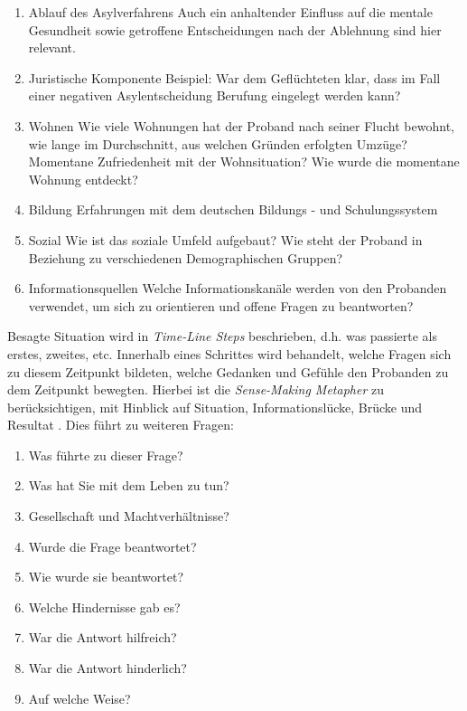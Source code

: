 \begin{enumerate}
    \item Ablauf des Asylverfahrens\newline
    Auch ein anhaltender Einfluss auf die mentale Gesundheit sowie getroffene Entscheidungen nach der Ablehnung sind hier relevant.
    \item Juristische Komponente \newline
    Beispiel: War dem Gefl\"uchteten klar, dass im Fall einer negativen Asylentscheidung Berufung eingelegt werden kann?
    \item Wohnen \newline
    Wie viele Wohnungen hat der Proband nach seiner Flucht bewohnt, wie lange im Durchschnitt, aus welchen Gr\"unden erfolgten Umz\"uge? Momentane Zufriedenheit mit der Wohnsituation? Wie wurde die momentane Wohnung entdeckt?
    \item Bildung \newline
    Erfahrungen mit dem deutschen Bildungs - und Schulungssystem
    \item Sozial\newline
    Wie ist das soziale Umfeld aufgebaut? Wie steht der Proband in Beziehung zu verschiedenen Demographischen Gruppen?
    \item Informationsquellen\newline
    Welche Informationskan\"ale werden von den Probanden verwendet, um sich zu orientieren und offene Fragen zu beantworten?
\end{enumerate}
Besagte Situation wird in \textit{Time-Line Steps} beschrieben, d.h. was passierte als erstes, zweites, etc. Innerhalb eines Schrittes wird behandelt, welche Fragen sich zu diesem Zeitpunkt bildeten, welche Gedanken und Gef\"uhle den Probanden zu dem Zeitpunkt bewegten.\newline
Hierbei ist die \textit{Sense-Making Metapher} zu ber\"ucksichtigen, mit Hinblick auf Situation, Informationsl\"ucke, Br\"ucke und Resultat \citep{dervin2003sense}.\newline
Dies f\"uhrt zu weiteren Fragen:\newline
\begin{enumerate}
    \item Was f\"uhrte zu dieser Frage?
    \item Was hat Sie mit dem Leben zu tun?
    \item Gesellschaft und Machtverh\"altnisse?
    \item Wurde die Frage beantwortet?
    \item Wie wurde sie beantwortet?
    \item Welche Hindernisse gab es?
    \item War die Antwort hilfreich?
    \item War die Antwort hinderlich?
    \item Auf welche Weise?
\end{enumerate}

